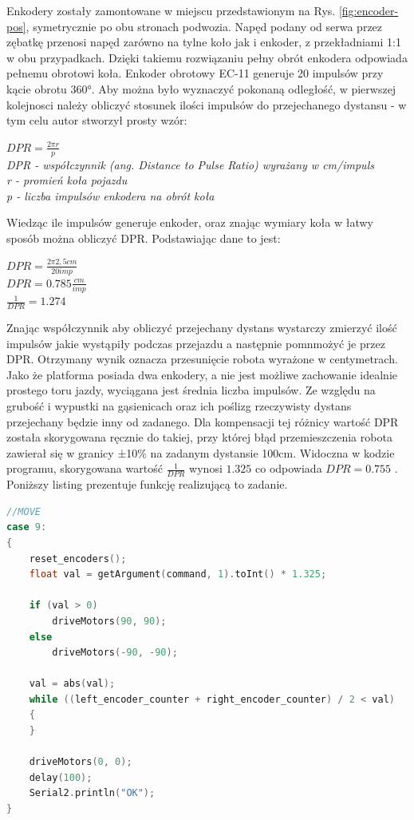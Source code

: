 Enkodery zostały zamontowane w miejscu przedstawionym na Rys. \ref{fig:encoder-pos}, symetrycznie po obu stronach podwozia. Napęd podany od serwa przez zębatkę przenosi napęd zarówno na tylne koło jak i enkoder, z przekładniami 1:1 w obu przypadkach. Dzięki takiemu rozwiązaniu pełny obrót enkodera odpowiada pełnemu obrotowi koła. Enkoder obrotowy EC-11 generuje 20 impulsów przy kącie obrotu 360°. Aby można było wyznaczyć pokonaną odległość, w pierwszej kolejnosci należy obliczyć stosunek ilości impulsów do przejechanego dystansu - w tym celu autor stworzył prosty wzór:

\begin{center}
    $DPR = \frac{2 \pi r}{p}$ \\
    \emph{DPR - współczynnik (ang. Distance to Pulse Ratio) wyrażany w cm/impuls} \\
    \emph{r - promień koła pojazdu} \\
    \emph{p - liczba impulsów enkodera na obrót koła}
\end{center}

Wiedząc ile impulsów generuje enkoder, oraz znając wymiary koła w łatwy sposób można obliczyć DPR. Podstawiając dane to jest:

\begin{center}
    $DPR = \frac{2 \pi 2,5cm}{20imp}$ \\
    $DPR = 0.785 \frac{cm}{imp}$ \\
    $\frac{1}{DPR} = 1.274$
\end{center}

Znając współczynnik aby obliczyć przejechany dystans wystarczy zmierzyć ilość impulsów jakie wystąpiły podczas przejazdu a następnie pomnmożyć je przez DPR. Otrzymany wynik oznacza przesunięcie robota wyrażone w centymetrach. Jako że platforma posiada dwa enkodery, a nie jest możliwe zachowanie idealnie prostego toru jazdy, wyciągana jest średnia liczba impulsów. Ze względu na grubość i wypustki na gąsienicach oraz ich poślizg rzeczywisty dystans przejechany będzie inny od zadanego. Dla kompensacji tej różnicy wartość DPR została skorygowana ręcznie do takiej, przy której błąd przemieszczenia robota zawierał się w granicy ±10\% na zadanym dystansie 100cm. Widoczna w kodzie programu, skorygowana wartość $\frac{1}{DPR}$ wynosi $1.325$ co odpowiada $DPR=0.755$ . Poniższy listing prezentuje funkcję realizującą to zadanie.


\begin{lstlisting}[basicstyle=\footnotesize\ttfamily,language=c++,caption=Fragment kodu obsługującego polecenie \emph{MOVE},label=lst:move]
//MOVE
case 9:
{
    reset_encoders();
    float val = getArgument(command, 1).toInt() * 1.325;

    if (val > 0)
        driveMotors(90, 90);
    else
        driveMotors(-90, -90);

    val = abs(val);
    while ((left_encoder_counter + right_encoder_counter) / 2 < val)
    {
    }

    driveMotors(0, 0);
    delay(100);
    Serial2.println("OK");
}
\end{lstlisting}

